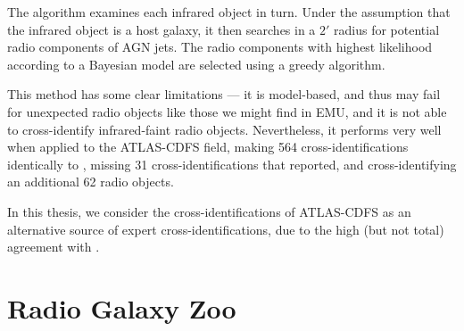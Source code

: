             The algorithm examines each infrared object in turn. Under the
            assumption that the infrared object is a host galaxy, it then
            searches in a $2'$ radius for potential radio components of AGN
            jets. The radio components with highest likelihood according to a
            Bayesian model are selected using a greedy algorithm.

            This method has some clear limitations --- it is model-based, and
            thus may fail for unexpected radio objects like those we might find
            in EMU, and it is not able to cross-identify infrared-faint radio
            objects. Nevertheless, it performs very well when applied to the
            ATLAS-CDFS field, making 564 cross-identifications identically to
            \citeauthor{norris06}, missing 31 cross-identifications that
            \citeauthor{norris06} reported, and cross-identifying an additional
            62 radio objects.

            In this thesis, we consider the \citeauthor{fan15}
            cross-identifications of ATLAS-CDFS as an alternative source of
            expert cross-identifications, due to the high (but not total)
            agreement with \citeauthor{norris06}.

    \section{Radio Galaxy Zoo}
    \label{sec:radio-galaxy-zoo}

